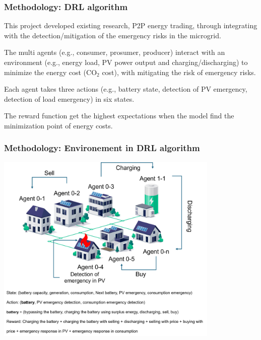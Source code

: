 \documentclass{beamer}
\begin{document}
\begin{frame}
\frametitle{Methodology: DRL algorithm}
\bit
\item This project developed existing research, P2P energy trading, through integrating with the detection/mitigation of the emergency risks in the microgrid. 
\item The multi agents (e.g., consumer, prosumer, producer) interact with an environment (e.g., energy load, PV power output and charging/discharging) to minimize the energy cost (CO$_2$ cost), with mitigating the risk of emergency risks. 
\item Each agent takes three actions (e.g., battery state, detection of PV emergency, detection of load emergency) in six states.
\item The reward function get the highest expectations when the model find the minimization point of energy costs. 
\eit
    
\end{frame}

\begin{frame}
\frametitle{Methodology: Environement in DRL algorithm}
\centering
\includegraphics[width=0.8\textwidth]{presentation/environment_v1.png}
\end{frame}
\end{document}

